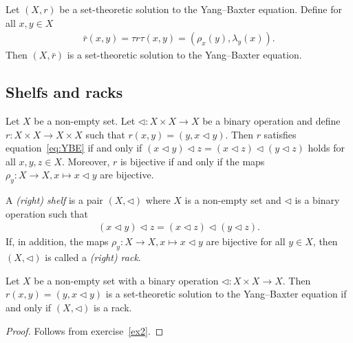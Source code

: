    \begin{exercise}
        Let $(X,r)$ be a set-theoretic solution to the Yang--Baxter equation. Define for all $x,y \in X$
        \begin{align*}
            \bar{r}(x,y) = \tau r \tau (x,y) = (\rho_x(y),\lambda_y(x)).
        \end{align*}
        Then $(X,\bar{r})$ is a set-theoretic solution to the Yang--Baxter equation.
    \end{exercise}

    \subsection{Shelfs and racks}\mbox{}
    
    \begin{exercise}\label{ex2}
         Let $X$ be a non-empty set.
         Let $\triangleleft: X\times X \to X$ be a binary operation and define $r: X\times X \to X\times X$ such that $r(x,y)= (y,x \triangleleft y)$. Then $r$ satisfies equation~\ref{eq:YBE} if and only if $(x\triangleleft y)\triangleleft z=(x\triangleleft z)\triangleleft(y\triangleleft z)$ holds for all $x,y,z \in X$. 
         Moreover, $r$ is bijective if and only if the maps $\rho_y:X\to X, x \mapsto x\triangleleft y$ are bijective.
    \end{exercise}

    \begin{definition}
         A \emph{(right) shelf} is a pair $(X,\triangleleft)$ where $X$ is a non-empty set and $\triangleleft$ is a binary operation such that 
        \begin{align*}
            (x\triangleleft y)\triangleleft z=(x\triangleleft z)\triangleleft(y\triangleleft z).
        \end{align*}
        If, in addition, the maps $\rho_y:X \to X, x \mapsto x\triangleleft y$ are bijective for all $y\in X$, then $(X,\triangleleft)$ is called a \emph{(right) rack}.
    \end{definition}

    \begin{proposition}
        Let $X$ be a non-empty set with a binary operation $\triangleleft: X\times X \to X$. Then $r(x,y) =(y,x\triangleleft y)$ is a set-theoretic solution to the Yang--Baxter equation if and only if $(X,\triangleleft)$ is a rack. 
    \end{proposition}

    \begin{proof}
        Follows from exercise~\ref{ex2}.
    \end{proof}

